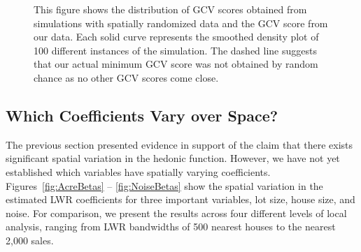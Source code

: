 \documentclass{article}\usepackage{graphicx, color}
\begin{document}
\begin{figure}
 \caption{This figure shows the distribution of GCV scores obtained from simulations with spatially randomized data and the GCV score from our data. Each solid curve represents the smoothed density plot of 100 different instances of the simulation. The dashed line suggests that our actual minimum GCV score was not obtained by random chance as no other GCV scores come close.}
 \label{fig:GCVSIM}
\end{figure}

\subsection{Which Coefficients Vary over Space?}

The previous section presented evidence in support of the claim that there exists significant spatial variation in the hedonic function. However, we have not yet established which variables have spatially varying coefficients. Figures~\ref{fig:AcreBetas} -- \ref{fig:NoiseBetas} show the spatial variation in the estimated LWR coefficients for three important variables, lot size, house size, and noise. For comparison, we present the results across four different levels of local analysis, ranging from LWR bandwidths of 500 nearest houses to the nearest 2,000 sales. 
\end{document}
